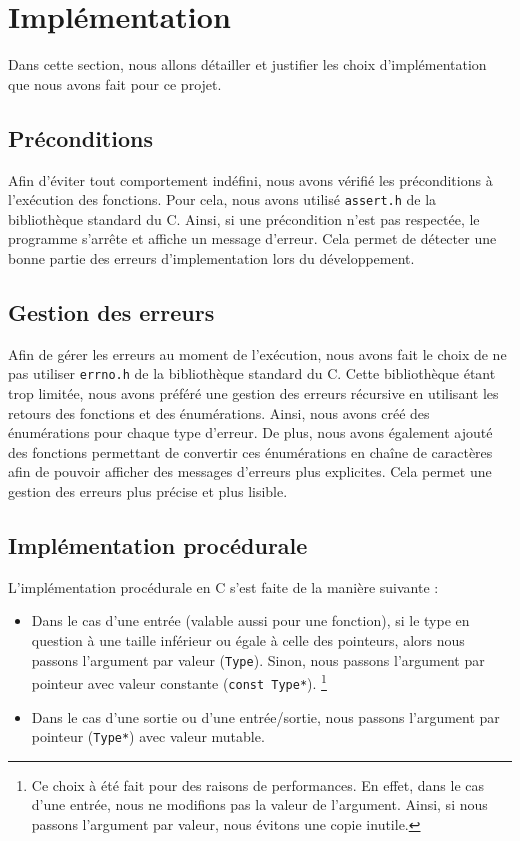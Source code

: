 \section{Implémentation}

Dans cette section, nous allons détailler et justifier les choix d'implémentation que nous avons fait pour ce projet.

\subsection{Préconditions}

Afin d'éviter tout comportement indéfini, nous avons vérifié les préconditions à l'exécution des fonctions.
Pour cela, nous avons utilisé \texttt{assert.h} de la bibliothèque standard du C. 
Ainsi, si une précondition n'est pas respectée, le programme s'arrête et affiche un message d'erreur.
Cela permet de détecter une bonne partie des erreurs d'implementation lors du développement.

\subsection{Gestion des erreurs}

Afin de gérer les erreurs au moment de l'exécution, nous avons fait le choix de ne pas utiliser \texttt{errno.h} de la bibliothèque standard du C.
Cette bibliothèque étant trop limitée, nous avons préféré une gestion des erreurs récursive en utilisant les retours des fonctions et des énumérations.
Ainsi, nous avons créé des énumérations pour chaque type d'erreur. De plus, nous avons également ajouté des fonctions permettant de convertir ces énumérations en chaîne de caractères afin de pouvoir afficher des messages d'erreurs plus explicites.
Cela permet une gestion des erreurs plus précise et plus lisible.

\subsection{Implémentation procédurale}

L'implémentation procédurale en C s'est faite de la manière suivante :

\begin{itemize}
    \item Dans le cas d'une entrée (valable aussi pour une fonction), si le type en question à une taille inférieur ou égale à celle des pointeurs, alors nous passons l'argument par valeur (\texttt{Type}).
    Sinon, nous passons l'argument par pointeur avec valeur constante (\texttt{const Type*}).
    \footnote{Ce choix à été fait pour des raisons de performances. En effet, dans le cas d'une entrée, nous ne modifions pas la valeur de l'argument. Ainsi, si nous passons l'argument par valeur, nous évitons une copie inutile.}
    \item Dans le cas d'une sortie ou d'une entrée/sortie, nous passons l'argument par pointeur (\texttt{Type*}) avec valeur mutable.
\end{itemize}

